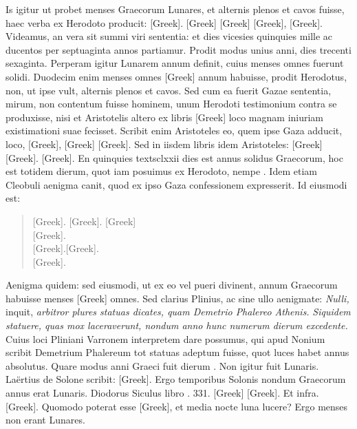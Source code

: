 Is igitur ut probet menses Graecorum
Lunares, et alternis plenos et cavos fuisse, haec verba ex Herodoto
producit: \textgreek{[Greek]}.
\textgreek{[Greek]}
\textgreek{[Greek]}
\textgreek{[Greek]}, \textgreek{[Greek]}.
Videamus, an vera sit summi
viri sententia: et dies vicesies quinquies mille ac ducentos per septuaginta
annos partiamur.
Prodit modus unius anni, dies trecenti sexaginta.
Perperam igitur Lunarem annum definit, cuius menses omnes
fuerunt solidi.
Duodecim enim menses omnes \textgreek{[Greek]}
annum habuisse, prodit Herodotus, non, ut ipse vult, alternis plenos
et cavos.
Sed cum ea fuerit Gazae sententia, mirum, non contentum
fuisse hominem, unum Herodoti testimonium contra se produxisse,
nisi et Aristotelis altero ex libris \textgreek{[Greek]}
 loco magnam iniuriam
existimationi suae fecisset.
Scribit enim Aristoteles eo, quem ipse
Gaza adducit, loco, \textgreek{[Greek]}, \textgreek{[Greek]}
\textgreek{[Greek]}.
Sed in iisdem libris idem Aristoteles: \textgreek{[Greek]}
\textgreek{[Greek]}. \textgreek{[Greek]}.
En quinquies
textsc{lxxii} dies est annus solidus Graecorum, hoc est totidem dierum,
quot iam posuimus ex Herodoto, nempe .
Idem etiam Cleobuli
aenigma canit, quod ex ipso Gaza confessionem expresserit.
Id eiusmodi
est:
\begin{verse}
\textgreek{[Greek]}. \textgreek{[Greek]}. \textgreek{[Greek]}\\
\textgreek{[Greek]}.\\
\textgreek{[Greek]}.\textgreek{[Greek]}.\\
\textgreek{[Greek]}.
\end{verse}

Aenigma quidem: sed eiusmodi, ut ex eo vel pueri divinent, annum
Graecorum habuisse menses \textgreek{[Greek]} omnes.
Sed clarius Plinius,
ac sine ullo aenigmate: \emph{Nulli,} inquit,
 \emph{arbitror plures statuas dicates,
quam Demetrio Phalereo Athenis.}
\emph{Siquidem}  \emph{statuere,
quas mox laceraverunt, nondum anno hunc numerum dierum excedente.}
Cuius loci Pliniani Varronem interpretem dare possumus,
qui apud Nonium scribit Demetrium Phalereum tot statuas adeptum
fuisse, quot luces habet annus absolutus.
Quare modus anni Graeci
fuit dierum .
Non igitur fuit Lunaris.
Laërtius de Solone
scribit: \textgreek{[Greek]}.
Ergo temporibus
Solonis nondum Graecorum annus erat Lunaris.
Diodorus Siculus
libro . 331. \textgreek{[Greek]}
\textgreek{[Greek]}.
Et infra. \textgreek{[Greek]}.
Quomodo poterat esse \textgreek{[Greek]}, et media nocte luna lucere?
Ergo menses
non erant Lunares.

